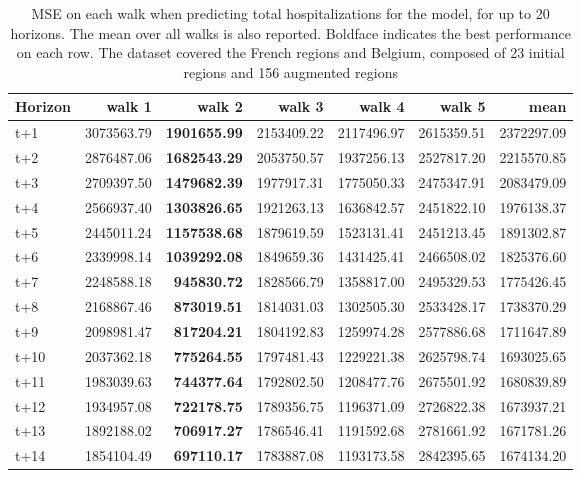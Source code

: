 \begin{table}[H]
\centering
\caption{MSE on each walk when predicting total hospitalizations for the model, for up to 20 horizons. The mean over all walks is also reported. Boldface indicates the best performance on each row. The dataset covered the French regions and Belgium, composed of 23 initial regions and 156 augmented regions }
\label{tab:MSE_walk_encoder_decoder}
\begin{tabular}{lrrrrrr}
\toprule
Horizon &     walk 1 &     walk 2 &     walk 3 &     walk 4 &     walk 5 &       mean \\
\midrule
t+1  & 3073563.79  & \textbf{1901655.99}  & 2153409.22  & 2117496.97  & 2615359.51  & 2372297.09  \\
t+2  & 2876487.06  & \textbf{1682543.29}  & 2053750.57  & 1937256.13  & 2527817.20  & 2215570.85  \\
t+3  & 2709397.50  & \textbf{1479682.39}  & 1977917.31  & 1775050.33  & 2475347.91  & 2083479.09  \\
t+4  & 2566937.40  & \textbf{1303826.65}  & 1921263.13  & 1636842.57  & 2451822.10  & 1976138.37  \\
t+5  & 2445011.24  & \textbf{1157538.68}  & 1879619.59  & 1523131.41  & 2451213.45  & 1891302.87  \\
t+6  & 2339998.14  & \textbf{1039292.08}  & 1849659.36  & 1431425.41  & 2466508.02  & 1825376.60  \\
t+7  & 2248588.18  & \textbf{945830.72}  & 1828566.79  & 1358817.00  & 2495329.53  & 1775426.45  \\
t+8  & 2168867.46  & \textbf{873019.51}  & 1814031.03  & 1302505.30  & 2533428.17  & 1738370.29  \\
t+9  & 2098981.47  & \textbf{817204.21}  & 1804192.83  & 1259974.28  & 2577886.68  & 1711647.89  \\
t+10  & 2037362.18  & \textbf{775264.55}  & 1797481.43  & 1229221.38  & 2625798.74  & 1693025.65  \\
t+11  & 1983039.63  & \textbf{744377.64}  & 1792802.50  & 1208477.76  & 2675501.92  & 1680839.89  \\
t+12  & 1934957.08  & \textbf{722178.75}  & 1789356.75  & 1196371.09  & 2726822.38  & 1673937.21  \\
t+13  & 1892188.02  & \textbf{706917.27}  & 1786546.41  & 1191592.68  & 2781661.92  & 1671781.26  \\
t+14  & 1854104.49  & \textbf{697110.17}  & 1783887.08  & 1193173.58  & 2842395.65  & 1674134.20  \\

\end{tabular}
\end{table}
